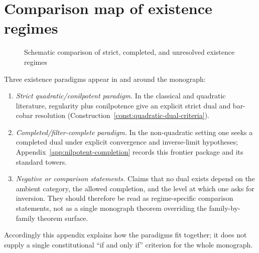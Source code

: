 
\section{Comparison map of existence regimes}
\label{sec:existence-summary}

\begin{figure}[H]
\centering
{}
\caption{Schematic comparison of strict, completed, and unresolved
existence regimes}
\label{fig:decision-tree-existence}
\end{figure}

\begin{remark}
\label{rem:existence-summary}
Three existence paradigms appear in and around the monograph:
\begin{enumerate}
\item \emph{Strict quadratic/conilpotent paradigm.}  In the classical
      and quadratic literature, regularity plus conilpotence give an
      explicit strict dual and bar-cobar resolution
      \textup{(}Construction~\ref{const:quadratic-dual-criteria}\textup{)}.
\item \emph{Completed/filter-complete paradigm.}  In the non-quadratic
      setting one seeks a completed dual under explicit convergence and
      inverse-limit hypotheses; Appendix~\ref{app:nilpotent-completion}
      records this frontier package and its standard towers.
\item \emph{Negative or comparison statements.}  Claims that no dual
      exists depend on the ambient category, the allowed completion, and the
      level at which one asks for inversion.  They should therefore be read
      as regime-specific comparison statements, not as a single monograph
      theorem overriding the family-by-family theorem surface.
\end{enumerate}
Accordingly this appendix explains how the paradigms fit together; it
does not supply a single constitutional ``if and only if'' criterion
for the whole monograph.
\end{remark}


